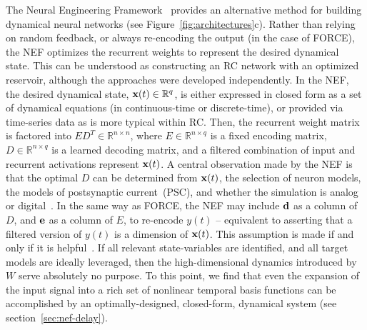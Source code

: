 The Neural Engineering Framework~\citep[NEF;][]{eliasmith1999developing,eliasmith2003a} provides an alternative method for building dynamical neural networks (see Figure~\ref{fig:architectures}c).
Rather than relying on random feedback, or always re-encoding the output (in the case of FORCE), the NEF optimizes the recurrent weights to represent the desired dynamical state.
This can be understood as constructing an RC network with an optimized reservoir, although the approaches were developed independently.
In the NEF, the desired dynamical state, $\mathbf{x}(t) \in \mathbb{R}^q$, is either expressed in closed form as a set of dynamical equations (in continuous-time or discrete-time), or provided via time-series data as is more typical within RC.
Then, the recurrent weight matrix is factored into $ED^T \in \mathbb{R}^{n \times n}$, where $E \in \mathbb{R}^{n \times q}$ is a fixed encoding matrix, $D \in \mathbb{R}^{n \times q}$ is a learned decoding matrix, and a filtered combination of input and recurrent activations represent $\mathbf{x}(t)$.
A central observation made by the NEF is that the optimal $D$ can be determined from $\mathbf{x}(t)$, the selection of neuron models, the models of postsynaptic current~(PSC), and whether the simulation is analog or digital~\citep{voelker2018}.
In the same way as FORCE, the NEF may include $\mathbf{d}$ as a column of $D$, and $\mathbf{e}$ as a column of $E$, to re-encode $y(t)$ -- equivalent to asserting that a filtered version of $y(t)$ is a dimension of $\mathbf{x}(t)$.
This assumption is made if and only if it is helpful~\citep[e.g.,~to perform integration;][]{singh2004}.
If all relevant state-variables are identified, and all target models are ideally leveraged, then the high-dimensional dynamics introduced by $W$ serve absolutely no purpose.
To this point, we find that even the expansion of the input signal into a rich set of nonlinear temporal basis functions can be accomplished by an optimally-designed, closed-form, dynamical system (see section~\ref{sec:nef-delay}).

